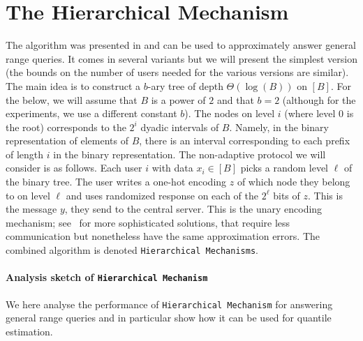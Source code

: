 \section{The Hierarchical Mechanism}\label{app:hierarchical-mech}
The algorithm was presented in \cite{kulkarni2019answering} and can be used to approximately answer general range queries. It comes in several variants but we will present the simplest version (the bounds on the number of users needed for the various versions are similar). The main idea is to construct a $b$-ary tree of depth $\Theta(\log(B))$ on $[B]$. For the below, we will assume that $B$ is a power of $2$ and that $b=2$ (although for the experiments, we use a different constant $b$). The nodes on level $i$ (where level 0 is the root) corresponds to the $2^i$ dyadic intervals of $B$. Namely, in the binary representation of elements of $B$, there is an interval corresponding to each prefix of length $i$ in the binary representation. The non-adaptive protocol we will consider is as follows. Each user $i$ with data $x_i\in[B]$ picks a random level $\ell$ of the binary tree. The user writes a one-hot encoding $z$ of which node they belong to on level $\ell$ and uses randomized response on each of the $2^\ell$ bits of $z$. This is the message $y$, they send to the central server. This is the unary encoding mechanism; see~\cite{kulkarni2019answering} for more sophisticated solutions, that require less communication but nonetheless have the same approximation errors. The combined algorithm is denoted \texttt{Hierarchical Mechanisms}. 

\paragraph{Analysis sketch of \texttt{Hierarchical Mechanism}}
We here analyse the performance of \texttt{Hierarchical Mechanism} for answering general range queries and in particular show how it can be used for quantile estimation.

